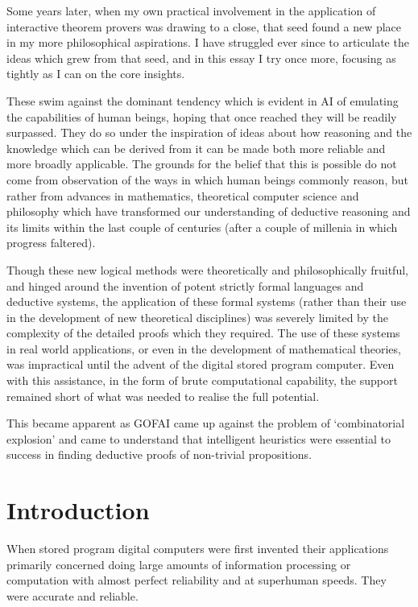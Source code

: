 \documentclass[10pt,titlepage]{book}
\begin{document}
Some years later, when my own practical involvement in the application of interactive theorem provers was drawing to a close, that seed found a new place in my more philosophical aspirations.
I have struggled ever since to articulate the ideas which grew from that seed, and in this essay I try once more, focusing as tightly as I can on the core insights.

These swim against the dominant tendency which is evident in AI of emulating the capabilities of human beings, hoping that once reached they will be readily surpassed.
They do so under the inspiration of ideas about how reasoning and the knowledge which can be derived from it can be made both more reliable and more broadly applicable.
The grounds for the belief that this is possible do not come from observation of the ways in which human beings commonly reason, but rather from advances in mathematics, theoretical computer science and philosophy which have transformed our understanding of deductive reasoning and its limits within the last couple of centuries (after a couple of millenia in which progress faltered).

Though these new logical methods were theoretically and philosophically fruitful, and hinged around the invention of potent strictly formal languages and deductive systems, the application of these formal systems (rather than their use in the development of new theoretical disciplines) was severely limited by the complexity of the detailed proofs which they required.
The use of these systems in real world applications, or even in the development of mathematical theories, was impractical until the advent of the digital stored program computer.
Even with this assistance, in the form of brute computational capability, the support remained short of what was needed to realise the full potential.

This became apparent as GOFAI came up against the problem of `combinatorial explosion' and came to understand that intelligent heuristics were essential to success in finding deductive proofs of non-trivial propositions.

\section{Introduction}

When stored program digital computers were first invented their applications primarily concerned doing large amounts of information processing or computation with almost perfect reliability and at superhuman speeds.
They were accurate and reliable.
\end{document}
